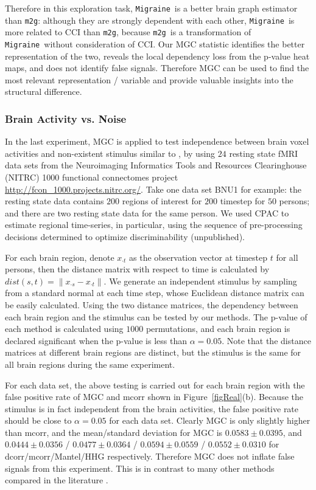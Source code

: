 \documentclass[11pt]{article}
\providecommand{\sct}[1]{{\sc \texttt{#1}}}
\newcommand{\Migraine}{\sct{Migraine}}
\newcommand{\mtg}{\sct{m2g}}
\begin{document}
Therefore in this exploration task, \Migraine~is a better brain graph estimator than \mtg: although they are strongly dependent with each other, \Migraine~is more related to CCI than \mtg, because \mtg~is a transformation of \Migraine~without consideration of CCI. Our MGC statistic identifies the better representation of the two, reveals the local dependency loss from the p-value heat maps, and does not identify false signals. Therefore MGC can be used to find the most relevant representation / variable and provide valuable insights into the structural difference.

\subsubsection{Brain Activity vs. Noise}

In the last experiment, MGC is applied to test independence between brain voxel activities and non-existent stimulus similar to \cite{EklundKnutsson2012}, by using $24$ resting state fMRI data sets from the Neuroimaging Informatics Tools and Resources Clearinghouse (NITRC) 1000 functional connectomes project \url{http://fcon_1000.projects.nitrc.org/}. Take one data set BNU1 for example: the resting state data contains $200$ regions of interest for $200$ timestep for $50$ persons; and there are 
two resting state data for the same person. We used CPAC to estimate regional time-series, in particular, using the sequence of pre-processing decisions determined to optimize discriminability (unpublished).

For each brain region, denote $x_{\cdot t}$ as the observation vector at timestep $t$ for all persons, then the distance matrix with respect to time is calculated by $dist(s,t)=\|x_{\cdot s}-x_{\cdot t}\|$. We generate an independent stimulus by sampling from a standard normal at each time step, whose Euclidean distance matrix can be easily calculated. Using the two distance matrices, the dependency between each brain region and the stimulus can be tested by our methods. The p-value of each method is calculated using $1000$ permutations, and each brain region is declared significant when the p-value is less than $\alpha=0.05$. Note that the distance matrices at different brain regions are distinct, but the stimulus is the same for all brain regions during the same experiment.

For each data set, the above testing is carried out for each brain region with the false positive rate of MGC and mcorr shown in Figure~\ref{figReal}(b). Because the stimulus is in fact independent from the brain activities, the false positive rate should be close to $\alpha=0.05$ for each data set. Clearly MGC is only slightly higher than mcorr, and the mean/standard deviation for MGC is $0.0583 \pm 0.0395$, and $0.0444 \pm 0.0356$ / $0.0477 \pm 0.0364$ / $0.0594 \pm 0.0559$ / $0.0552 \pm 0.0310$ for dcorr/mcorr/Mantel/HHG respectively. Therefore MGC does not inflate false signals from this experiment. This is in contrast to many other methods compared in the literature \cite{EklundKnutsson2012}.
\end{document}
